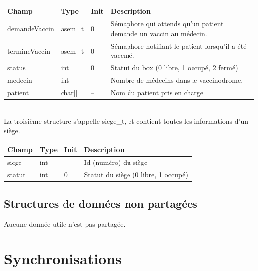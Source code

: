 \documentclass[a4paper]{article}
\makeatletter
\newenvironment{expl}{%
  \begin{list}{}{%
      \small\itshape%
      \topsep\z@%
      \listparindent0pt%
      \parsep0.75\baselineskip%
      \setlength{\leftmargin}{20mm}%
      \setlength{\rightmargin}{20mm}%
    }
  \item[]}%
  {\end{list}}
\makeatother
\begin{document}
    \begin{tabularx}{\linewidth}{|l|l|l|X|}
    \hline
    Champ & Type & Init & Description \\ \hline%
    demandeVaccin & asem\_t & 0 & Sémaphore qui attends qu'un patient demande un vaccin au médecin. \\ \hline%
    termineVaccin & asem\_t & 0 & Sémaphore notifiant le patient lorsqu'il a été vacciné. \\ \hline%
    status & int & 0 & Statut du box (0 libre, 1 occupé, 2 fermé) \\ \hline%
    medecin & int & -- & Nombre de médecins dans le vaccinodrome. \\ \hline%
    patient & char[] & -- & Nom du patient pris en charge \\ \hline%

  \end{tabularx}
  \\[12pt]
    La troisième structure s'appelle siege\_t, et contient toutes les informations d'un siège.

    \begin{tabularx}{\linewidth}{|l|l|l|X|}
    \hline
    Champ & Type & Init & Description \\ \hline%
    siege & int & -- & Id (numéro) du siège \\ \hline%
    statut & int & 0 & Statut du siège (0 libre, 1 occupé) \\ \hline%

  \end{tabularx}

\subsection{Structures de données non partagées}

\begin{expl}
    Aucune donnée utile n'est pas partagée.
\end{expl}

\newpage

\section{Synchronisations}
\end{document}
